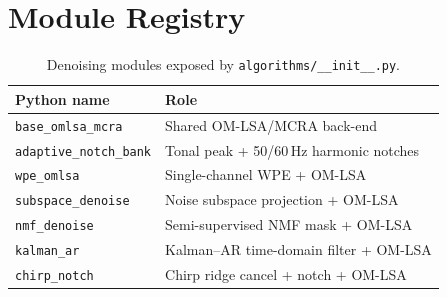 \section{Module Registry}

\begin{table}[H]
  \centering
  \caption{Denoising modules exposed by \texttt{algorithms/\_\_init\_\_.py}.}
  \label{tab:modules}
  \begin{tabular}{ll}
    \toprule
    \textbf{Python name} & \textbf{Role} \\
    \midrule
    \texttt{base\_omlsa\_mcra}      & Shared OM-LSA/MCRA back-end \\
    \texttt{adaptive\_notch\_bank}  & Tonal peak + 50/60\,Hz harmonic notches \\
    \texttt{wpe\_omlsa}             & Single-channel WPE + OM-LSA \\
    \texttt{subspace\_denoise}      & Noise subspace projection + OM-LSA \\
    \texttt{nmf\_denoise}           & Semi-supervised NMF mask + OM-LSA \\
    \texttt{kalman\_ar}             & Kalman--AR time-domain filter + OM-LSA \\
    \texttt{chirp\_notch}           & Chirp ridge cancel + notch + OM-LSA \\
    \bottomrule
  \end{tabular}
\end{table}
